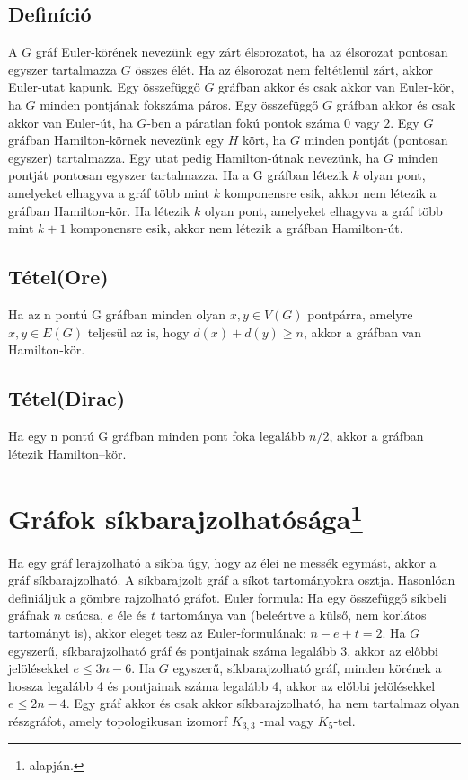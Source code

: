 \documentclass[12pt,a4paper,twoside]{report}
\begin{document}
\subsection{Definíció}
A $G$ gráf Euler-körének nevezünk egy zárt élsorozatot, ha az élsorozat pontosan egyszer tartalmazza $G$ összes élét. Ha az élsorozat nem feltétlenül zárt, akkor Euler-utat kapunk.
\ttl
Egy összefüggő $G$ gráfban akkor és csak akkor van Euler-kör, ha $G$ minden pontjának fokszáma páros.
\ttl
 Egy összefüggő $G$ gráfban akkor és csak akkor van Euler-út, ha $G$-ben a páratlan fokú pontok száma $0$ vagy $2$.
\df
Egy $G$ gráfban Hamilton-körnek nevezünk egy $H$ kört, ha $G$ minden pontját (pontosan egyszer) tartalmazza. Egy utat pedig Hamilton-útnak nevezünk, ha $G$ minden pontját pontosan egyszer tartalmazza.
\ttl
Ha a G gráfban létezik $k$ olyan pont, amelyeket elhagyva a gráf több mint $k$ komponensre esik, akkor nem létezik a gráfban Hamilton-kör. Ha létezik $k$ olyan pont, amelyeket elhagyva a gráf több mint $k + 1$ komponensre esik, akkor nem létezik a gráfban Hamilton-út.
\subsection{Tétel(Ore)}
Ha az n pontú G gráfban minden olyan $x, y \in V (G)$ pontpárra, amelyre ${x, y} \in E(G)$ teljesül az is, hogy $d(x) + d(y) \geq n$, akkor a gráfban van Hamilton-kör.
\subsection{Tétel(Dirac)}
Ha egy n pontú G gráfban minden pont foka legalább $n/2$, akkor a gráfban létezik Hamilton–kör.
\section{Gráfok síkbarajzolhatósága\protect\footnote{\cite{kv} alapján.}}
\df
Ha egy gráf lerajzolható a síkba úgy, hogy az élei ne messék egymást, akkor a gráf síkbarajzolható. A síkbarajzolt gráf a síkot tartományokra osztja. Hasonlóan definiáljuk a gömbre rajzolható gráfot.
\ttl
Euler formula: Ha egy összefüggő síkbeli gráfnak $n$ csúcsa, $e$ éle és $t$ tartománya van (beleértve a külső, nem korlátos tartományt is), akkor eleget tesz az Euler-formulának: $n-e+t = 2$.
\ttl
Ha $G$ egyszerű, síkbarajzolható gráf és pontjainak száma legalább 3, akkor az előbbi jelölésekkel $e\leq3n-6$.
\ttl
Ha $G$ egyszerű, síkbarajzolható gráf, minden körének a hossza legalább 4 és pontjainak száma legalább 4, akkor az előbbi jelölésekkel $e\leq2n-4$.
\ttl
Egy gráf akkor és csak akkor síkbarajzolható, ha nem tartalmaz olyan részgráfot, amely topologikusan izomorf $K_{3,3}$ -mal vagy $K_5$-tel.
\end{document}
